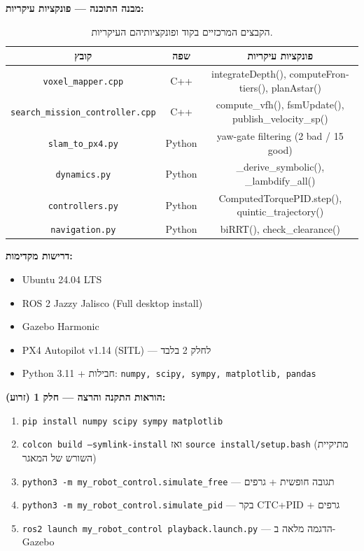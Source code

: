 \documentclass[11pt,a4paper]{article}
\begin{document}
\textbf{מבנה התוכנה — פונקציות עיקריות:}
\begin{table}[H]
\centering
\small
\begin{tabular}{ccc}
\toprule
\textbf{קובץ} & \textbf{שפה} & \textbf{פונקציות עיקריות} \\
\midrule
\texttt{\textenglish{voxel\_mapper.cpp}} & \textenglish{C++} & \textenglish{integrateDepth(), computeFrontiers(), planAstar()} \\
\texttt{\textenglish{search\_mission\_controller.cpp}} & \textenglish{C++} & \textenglish{compute\_vfh(), fsmUpdate(), publish\_velocity\_sp()} \\
\texttt{\textenglish{slam\_to\_px4.py}} & \textenglish{Python} & \textenglish{yaw-gate filtering (2 bad / 15 good)} \\
\texttt{\textenglish{dynamics.py}} & \textenglish{Python} & \textenglish{\_derive\_symbolic(), \_lambdify\_all()} \\
\texttt{\textenglish{controllers.py}} & \textenglish{Python} & \textenglish{ComputedTorquePID.step(), quintic\_trajectory()} \\
\texttt{\textenglish{navigation.py}} & \textenglish{Python} & \textenglish{biRRT(), check\_clearance()} \\
\bottomrule
\end{tabular}
\caption{הקבצים המרכזיים בקוד ופונקציותיהם העיקריות.}
\label{tab:main_functions}
\end{table}

\textbf{דרישות מקדימות:}
\begin{itemize}
    \item \textenglish{Ubuntu 24.04 LTS}
    \item \textenglish{ROS 2 Jazzy Jalisco} (Full desktop install)
    \item \textenglish{Gazebo Harmonic}
    \item \textenglish{PX4 Autopilot v1.14} (SITL) — לחלק 2 בלבד
    \item \textenglish{Python 3.11} + חבילות: \texttt{\textenglish{numpy, scipy, sympy, matplotlib, pandas}}
\end{itemize}

\textbf{הוראות התקנה והרצה — חלק 1 (זרוע):}
\begin{enumerate}
    \item \texttt{\textenglish{pip install numpy scipy sympy matplotlib}}
    \item \texttt{\textenglish{colcon build --symlink-install}} ואז \texttt{\textenglish{source install/setup.bash}} (מתיקיית השורש של המאגר)
    \item \texttt{\textenglish{python3 -m my\_robot\_control.simulate\_free}} \; — תגובה חופשית + גרפים
    \item \texttt{\textenglish{python3 -m my\_robot\_control.simulate\_pid}} \; — בקר \textenglish{CTC+PID} + גרפים
    \item \texttt{\textenglish{ros2 launch my\_robot\_control playback.launch.py}} \; — הדגמה מלאה ב-\textenglish{Gazebo}
\end{enumerate}
\end{document}
